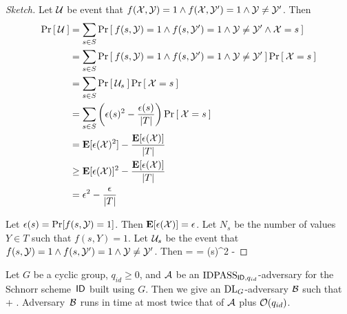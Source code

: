 \begin{proof}[Sketch]
Let ${\cal U}$ be event that $f({\cal X},{\cal Y}) = 1 \land f({\cal X},{\cal Y}') = 1 \land
{\cal Y} \ne {\cal Y}'$. Then 
\begin{align*}
  \Pr\left[\: {\cal U} \:\right] 
  & = \sum_{s \in S} \Pr\left[\: f(s,{\cal Y}) = 1 \land f(s,{\cal Y}') = 1 \land {\cal Y} \ne {\cal Y}' \land {\cal X} = s \:\right]\\
  & = \sum_{s \in S} \Pr\left[\: f(s,{\cal Y}) = 1 \land f(s,{\cal Y}') = 1 \land {\cal Y} \ne {\cal Y}' \:\right]\Pr\left[\: {\cal X} = s \:\right]\\
  & = \sum_{s \in S} \Pr\left[\: {\cal U}_s \:\right] \Pr\left[\: {\cal X} = s \:\right]\\
  & = \sum_{s \in S} \left(\epsilon(s)^2 - \frac{\epsilon(s)}{|T|}\right) \Pr\left[\: {\cal X} = s \:\right]\\
  & = {\textbf E}[\epsilon({\cal X})^2] - \frac{{\textbf E}[\epsilon({\cal X})]}{|T|}\\
  & \ge {\textbf E}[\epsilon({\cal X})]^2 - \frac{{\textbf E}[\epsilon({\cal X})]}{|T|}\\
  & = \epsilon^2 - \frac{\epsilon}{|T|}
\end{align*}

Let $\epsilon(s) = \Pr[f(s,{\cal Y}) = 1]$. 
Then ${\textbf E}[\epsilon({\cal X})] = \epsilon$. Let $N_s$ be the number of values
$Y \in T$ such that $f(s,Y) = 1$. Let ${\cal U}_s$ be the event that $f(s,{\cal Y}) =
1 \land f(s,{\cal Y}') = 1 \land {\cal Y} \ne {\cal Y}'$. Then
\bnm
   =  = \epsilon(s)^2 -  
\enm
\end{proof}




\begin{theorem*}
\label{thm:idpass-dl-adv}
Let $G$ be a cyclic group, $q_{id} \ge 0$, 
and ${\mathcal A}$ be an $\textnormal{IDPASS}_{\textsf{ID},q_{id}}$-adversary for the Schnorr
scheme~$\textsf{ID}$
built using $G$. Then we give an $\textnormal{DL}_G$-adversary ${\mathcal B}$ such that
\bnm
   \le {} +  \;.
\enm
Adversary~${\mathcal B}$ runs in time at most twice that of ${\mathcal A}$ plus
${\cal O}(q_{id})$.
\end{theorem*}

